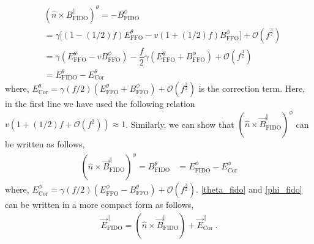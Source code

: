 \documentclass[aps,prd,twocolumn,floatfix,noshowpacs,tightenlines,noshowkeys,superscriptaddress,amsmath,amssymb,
nofootinbib]{revtex4-1}
\renewcommand\[{\begin{equation}}
\renewcommand\]{\end{equation}}
\begin{document}
\begin{equation}\label{theta_fido}
	\begin{aligned}
	&(\hat{n}\times B^\parallel_{\textrm{FIDO}})^{\theta}=-B^{\phi}_{\textrm{FIDO}}\\&=\gamma\Big[(1-(1/2)f) {E}^\theta_{\textrm{FFO}}-v(1+(1/2)f)B^\phi_{\textrm{FFO}}\Big]+\mathcal{O}(f^\frac{3}{2})\\
	&=\gamma\left(E^\theta_{\textrm{FFO}}-v B^\phi_{\textrm{FFO}}\right)-\dfrac{f}{2}\gamma\left(E^\theta_{\textrm{FFO}}+ B^\phi_{\textrm{FFO}}\right)+\mathcal{O}(f^\frac{3}{2})\\
	&={E}^\theta_{\textrm{FIDO}}-{E}^\theta_{\textrm{Cor}}
	\end{aligned}
\end{equation}
where, ${E}^\theta_{\textrm{Cor}}=\gamma(f/2)\left(E^\theta_{\textrm{FFO}}+ B^\phi_{\textrm{FFO}}\right)+\mathcal{O}(f^\frac{3}{2})$ is the correction term. Here, in the first line we have used the following relation $v(1+(1/2)f+\mathcal{O}(f^2))\approx1$.  Similarly, we can show that $(\hat{n}\times \vec{B}^\parallel_{\textrm{FIDO}})^{\phi}$ can be written as follows,
\begin{equation}\label{phi_fido}
	\begin{aligned}
		(\hat{n}\times \vec{B}^\parallel_{\textrm{FIDO}})^{\phi}=B^{\theta}_{\textrm{FIDO}}&={E}^\phi_{\textrm{FIDO}}-{E}^\phi_{\textrm{Cor}}
	\end{aligned}
\end{equation}
where, ${E}^\phi_{\textrm{Cor}}=\gamma(f/2)\left(E^\phi_{\textrm{FFO}}- B^\theta_{\textrm{FFO}}\right)+\mathcal{O}(f^\frac{3}{2})$.  \autoref{theta_fido} and \autoref{phi_fido} can be written in a more compact form as follows,
\begin{equation}\label{parallel_fields}
	\begin{aligned}
		\vec{E}^\parallel_{\textrm{FIDO}}=(\hat{n}\times \vec{B}^\parallel_{\textrm{FIDO}})+\vec{E}^\parallel_{\textrm{Cor}}~.
	\end{aligned}
\end{equation}
\end{document}
